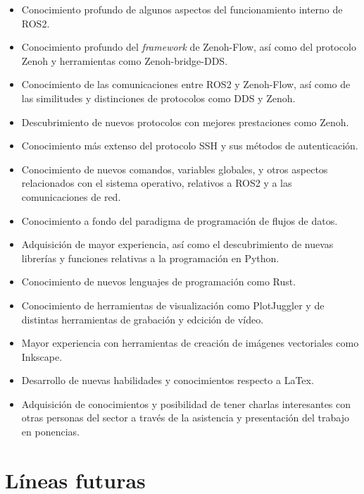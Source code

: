 \begin{itemize}
    \item{Conocimiento profundo de algunos aspectos del funcionamiento interno
        de ROS2.}
    \item{Conocimiento profundo del \textit{framework} de Zenoh-Flow, así como
        del protocolo Zenoh y herramientas como Zenoh-bridge-DDS.}
    \item{Conocimiento de las comunicaciones entre ROS2 y Zenoh-Flow, así como
        de las similitudes y distinciones de protocolos como DDS y Zenoh.}
    \item{Descubrimiento de nuevos protocolos con mejores prestaciones como
        Zenoh.}
    \item{Conocimiento más extenso del protocolo SSH y sus métodos de
        autenticación.}
    \item{Conocimiento de nuevos comandos, variables globales, y otros aspectos
        relacionados con el sistema operativo, relativos a ROS2 y a las
        comunicaciones de red.}
    \item{Conocimiento a fondo del paradigma de programación de flujos de
        datos.}
    \item{Adquisición de mayor experiencia, así como el descubrimiento de nuevas
        librerías y funciones relativas a la programación en Python.}
    \item{Conocimiento de nuevos lenguajes de programación como Rust.}
    \item{Conocimiento de herramientas de visualización como PlotJuggler y de
        distintas herramientas de grabación y edcición de vídeo.}
    \item{Mayor experiencia con herramientas de creación de imágenes vectoriales
        como Inkscape.}
    \item{Desarrollo de nuevas habilidades y conocimientos respecto a LaTex.}
    \item{Adquisición de conocimientos y posibilidad de tener charlas
        interesantes con otras personas del sector a través de la asistencia y
        presentación del trabajo en ponencias.}
\end{itemize}


\section{Líneas futuras}
\label{sec:lineas_futuras}

